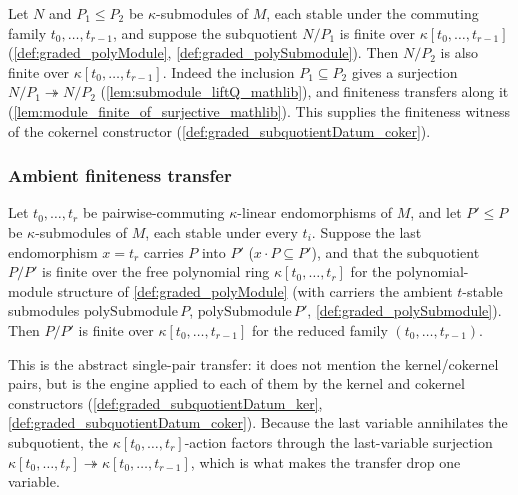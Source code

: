 \begin{lemma}

  \label{lem:graded_polyQuot_finite_of_le_denominator}
  Let \(N\) and \(P_1 \le P_2\) be \(\kappa\)-submodules of \(M\), each stable under
  the commuting family \(t_0, \dots, t_{r-1}\), and suppose the subquotient
  \(N/P_1\) is finite over \(\kappa[t_0, \dots, t_{r-1}]\)
  (\cref{def:graded_polyModule}, \cref{def:graded_polySubmodule}). Then \(N/P_2\) is
  also finite over \(\kappa[t_0, \dots, t_{r-1}]\). Indeed the inclusion
  \(P_1 \subseteq P_2\) gives a surjection \(N/P_1 \twoheadrightarrow N/P_2\)
  (\cref{lem:submodule_liftQ_mathlib}), and finiteness transfers along it
  (\cref{lem:module_finite_of_surjective_mathlib}). This supplies the
  finiteness witness of the cokernel constructor
  (\cref{def:graded_subquotientDatum_coker}).
\end{lemma}

\subsubsection*{Ambient finiteness transfer}

\begin{lemma}
  \label{lem:graded_subquotient_finite_transfer}
  Let \(t_0, \dots, t_r\) be pairwise-commuting \(\kappa\)-linear endomorphisms of
  \(M\), and let \(P' \le P\) be \(\kappa\)-submodules of \(M\), each stable under
  every \(t_i\). Suppose the last endomorphism \(x = t_r\) carries \(P\) into \(P'\)
  (\(x \cdot P \subseteq P'\)), and that the subquotient \(P/P'\) is finite over the
  free polynomial ring \(\kappa[t_0, \dots, t_r]\) for the polynomial-module structure
  of \cref{def:graded_polyModule} (with carriers the ambient \(t\)-stable submodules
  \(\mathrm{polySubmodule}\,P\), \(\mathrm{polySubmodule}\,P'\),
  \cref{def:graded_polySubmodule}). Then \(P/P'\) is finite over
  \(\kappa[t_0, \dots, t_{r-1}]\) for the reduced family \((t_0, \dots, t_{r-1})\).

  This is the abstract single-pair transfer: it does not mention the kernel/cokernel
  pairs, but is the engine applied to each of them by the kernel and cokernel
  constructors (\cref{def:graded_subquotientDatum_ker},
  \cref{def:graded_subquotientDatum_coker}). Because the last variable
  annihilates the subquotient, the \(\kappa[t_0, \dots, t_r]\)-action factors through
  the last-variable surjection \(\kappa[t_0, \dots, t_r] \twoheadrightarrow
  \kappa[t_0, \dots, t_{r-1}]\), which is what makes the transfer drop one variable.
\end{lemma}

